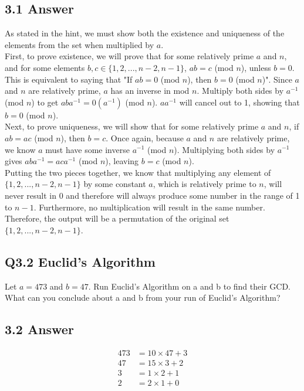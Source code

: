 \documentclass{article}
\begin{document}
\subsection*{3.1 Answer}
As stated in the hint, we must show both the existence and uniqueness of the elements from the set when multiplied by $a$.
\\ First, to prove existence, we will prove that for some relatively prime $a$ and $n$, and for some elements $b,c\in \{1,2,...,n-2,n-1\}$,  $ab=c$ (mod $n$), unless $b=0$. This is equivalent to saying that "If $ab=0$ (mod $n$), then $b=0$ (mod $n$)". Since $a$ and $n$ are relatively prime, $a$ has an inverse in mod $n$. Multiply both sides by $a^{-1}$ (mod $n$) to get $aba^{-1}=0(a^{-1})$ (mod $n$). $aa^{-1}$ will cancel out to 1, showing that $b=0$ (mod $n$).
\\ Next, to prove uniqueness, we will show that for some relatively prime $a$ and $n$, if $ab=ac$ (mod $n$), then $b=c$. Once again, because $a$ and $n$ are relatively prime, we know $a$ must have some inverse $a^{-1}$ (mod $n$). Multiplying both sides by $a^{-1}$ gives $aba^{-1}=aca^{-1}$ (mod $n$), leaving $b=c$ (mod $n$).
\\ Putting the two pieces together, we know that multiplying any element of $\{1,2,...,n-2,n-1\}$ by some constant $a$, which is relatively prime to $n$, will never result in 0 and therefore will always produce some number in the range of 1 to $n-1$. Furthermore, no multiplication will result in the same number. Therefore, the output will be a permutation of the original set $\{1,2,...,n-2,n-1\}$.
\newpage
\subsection*{Q3.2 Euclid's Algorithm}
Let $a = 473$ and $b = 47$. Run Euclid's Algorithm on a and b to find their GCD. What can you conclude about a and b from your run of Euclid's Algorithm?
\newpage
\subsection*{3.2 Answer}

\begin{align*}
473 &= 10 \times 47 + 3 \\
47 &= 15 \times 3 + 2 \\
3 &= 1 \times 2 + 1 \\
2 &= 2 \times 1 + 0 \\
\end{align*}
\end{document}
